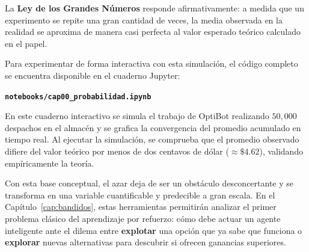 La \textbf{Ley de los Grandes Números} responde afirmativamente: a medida que un experimento se repite una gran cantidad de veces, la media observada en la realidad se aproxima de manera casi perfecta al valor esperado teórico calculado en el papel.

Para experimentar de forma interactiva con esta simulación, el código completo se encuentra disponible en el cuaderno Jupyter:
\begin{center}
  \textbf{\texttt{notebooks/cap00\_probabilidad.ipynb}}
\end{center}
En este cuaderno interactivo se simula el trabajo de OptiBot realizando $50{,}000$ despachos en el almacén y se grafica la convergencia del promedio acumulado en tiempo real. Al ejecutar la simulación, se comprueba que el promedio observado difiere del valor teórico por menos de dos centavos de dólar ($\approx \$4.62$), validando empíricamente la teoría.

\begin{notabox}
Con esta base conceptual, el azar deja de ser un obstáculo desconcertante y se transforma en una variable cuantificable y predecible a gran escala. En el Capítulo~\ref{cap:bandidos}, estas herramientas permitirán analizar el primer problema clásico del aprendizaje por refuerzo: cómo debe actuar un agente inteligente ante el dilema entre \textbf{explotar} una opción que ya sabe que funciona o \textbf{explorar} nuevas alternativas para descubrir si ofrecen ganancias superiores.
\end{notabox}

